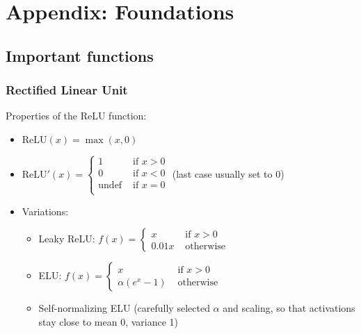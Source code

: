 \section{Appendix: Foundations}
\subsection{Important functions}
\subsubsection{Rectified Linear Unit}
Properties of the ReLU function:
\begin{itemize}
	\item $\text{ReLU}(x)=\max(x,0)$
	\item $\text{ReLU}'(x)=\begin{cases}
	1 & \text{ if } x>0\\
	0 & \text{ if } x<0\\
	\text{undef} & \text{ if } x=0\\
	\end{cases}$ (last case usually set to 0)
	\item Variations: 
	\begin{itemize}
		\item Leaky ReLU: $f(x)=\begin{cases}
		x & \text{ if } x>0\\
		0.01x & \text{ otherwise }
		\end{cases}$
		\item ELU: $f(x)=\begin{cases}
		x & \text{ if } x>0\\
		\alpha (e^x-1) & \text{ otherwise }
		\end{cases}$
		\item Self-normalizing ELU (carefully selected $\alpha$ and scaling, so that activations stay close to mean 0, variance 1)
	\end{itemize}
\end{itemize}
